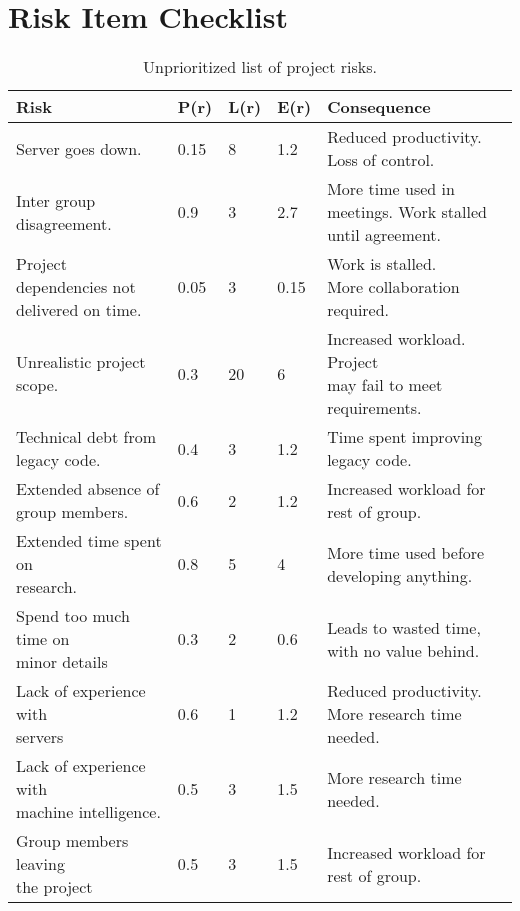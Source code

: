 \chapter{Risk Item Checklist} \label{app:A}
\bgroup 
\def\arraystretch{2}
\begin{table}[htbp]
    \begin{tabular}{| m{45mm} | l | l | l | m{50mm} |}
        \hline
        \textbf{Risk} & \textbf{P(r)} & \textbf{L(r)} & \textbf{E(r)} & \textbf{Consequence} \\
        \hline
        Server goes down. & 0.15 & 8 & 1.2 & \makecell[l]{Reduced productivity. \\ Loss of control.} \\
        \hline
        Inter group disagreement. & 0.9 & 3 & 2.7 & More time used in meetings. Work stalled until agreement. \\
        \hline
        Project dependencies not delivered on time. & 0.05 & 3 & 0.15 & \makecell[l]{Work is stalled. \\ More collaboration required.} \\
        \hline
        Unrealistic project scope. & 0.3 & 20 & 6 & \makecell[l]{Increased workload. Project \\ may fail to meet requirements.} \\
        \hline
        \makecell[l]{Technical debt from \\ legacy code.} & 0.4 & 3 & 1.2 & Time spent improving legacy code. \\
        \hline
        \makecell[l]{Extended absence of \\ group members.} & 0.6 & 2 & 1.2 & Increased workload for rest of group. \\
        \hline
        \makecell[l]{Extended time spent on \\ research.} & 0.8 & 5 & 4 & More time used before developing anything. \\
        \hline
        \makecell[l]{Spend too much time on \\ minor details} & 0.3 & 2 & 0.6 & Leads to wasted time, with no value behind. \\
        \hline
        \makecell[l]{Lack of experience with \\ servers} & 0.6 & 1 & 1.2 & Reduced productivity. More research time needed. \\
        \hline
        \makecell[l]{Lack of experience with \\ machine intelligence.} & 0.5 & 3 & 1.5 & More research time needed. \\
        \hline
        \makecell[l]{Group members leaving \\ the project} & 0.5 & 3 & 1.5 & Increased workload for rest of group. \\
        \hline
    \end{tabular}
    \caption{Unprioritized list of project risks.}
    \label{tab:risk_analysis}
\end{table}
\egroup